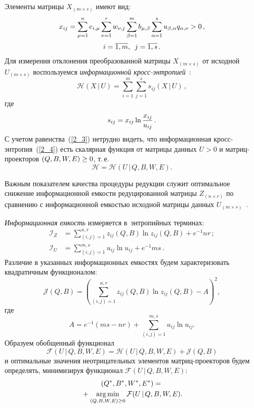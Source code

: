 \begin{multicols}{2}
Элементы матрицы $X_{(m \times s)}$ имеют вид:
\begin{multline}
\label{2_3}
x_{ij} = \sum\limits^n_{\mu=1} e_{i,\mu} \sum\limits^r_{\nu=1} w_{\nu,j} 
\sum\limits^m_{\beta=1} b_{\mu,\beta} \sum^s_{\alpha=1} u_{\beta,\alpha} 
q_{\alpha,\nu} > 0\,,\\[2pt] 
i = \overline{1,m},\enskip 
j = \overline{1,s}\,.
\end{multline}
Для измерения отклонения преобразованной матрицы $X_{(m \times s)}$ от 
исходной $U_{(m \times s)}$ воспользуемся \textit{информационной кросс-эн\-тро\-пи\-ей}~\cite{Kullback_1951}:
\begin{equation}
\label{2_4}
\mathcal{H}(X\,|\,U) = \sum\limits^m_{i=1}\sum^s_{j=1} s_{ij}(X\,|\,U)\,,
\end{equation}
где
\begin{equation*}
s_{ij} = x_{ij} \ln \displaystyle\frac{\displaystyle x_{ij}\mathstrut}{\displaystyle u_{ij}\mathstrut}\,.
\end{equation*}
С учетом равенства~(\ref{2_3}) нетрудно видеть, что информационная 
кросс-эн\-тро\-пия~(\ref{2_4}) есть скалярная функция от матрицы данных $U > 0$ и 
мат\-риц-про\-ек\-то\-ров $(Q, B, W, E) \hm\ge 0$, т.\,е.
\begin{equation*}
\mathcal{H} = \mathcal{H}(U\,|\,Q,B,W,E).
\end{equation*}

Важным показателем качества процедуры редукции служит оптимальное снижение 
информационной емкости редуцированной матрицы $Z_{(n \times r)}$ по сравнению 
с информационной емкостью исходной матрицы данных $U_{(m \times 
s)}$~\cite{Popkov_2019_dan}.

\textit{Информационная емкость} измеряется в~энтропийных терминах:
\begin{align*}
\mathcal{I}_Z &= \sum\limits^{n,r}_{(i,j)=1} z_{ij}(Q,B) \ln z_{ij}(Q,B) + 
e^{-1} nr\,;\\
\mathcal{I}_U &= \sum\limits^{m,s}_{(i,j)=1} u_{ij} \ln u_{ij} + e^{-1} 
ms\,. %
\end{align*}
Различие в указанных информационных емкостях будем характеризовать 
квадратичным функционалом:
\begin{equation*}
\mathcal{J}(Q,B) \!= \!\left(\sum\limits^{n,r}_{(i,j)=1}\!\! z_{ij}(Q,B) \ln 
z_{ij}(Q,B) - A\! \right)^{\!2}\!\!,\!\!\!
\end{equation*}
где
\begin{equation*}
A = e^{-1}(ms - nr) + \sum\limits^{m,s}_{(i,j)=1} u_{ij} \ln u_{ij}.
\end{equation*}
Образуем обобщенный функционал
\begin{equation*}
\mathcal{F}(U\,|\,Q,B,W,E) = \mathcal{H}(U\,|\,Q,B,W,E) + \mathcal{J}(Q,B)
\end{equation*}
и оптимальные значения неотрицательных элементов мат\-риц-про\-ек\-то\-ров 
будем определять, минимизируя функционал $\mathcal{F}(U\,|\,Q,B,W,E)$:
\begin{multline}
\label{2_10}
(Q^*,B^*,W^*,E^*) ={}\\
{}+ \mathop{\mathrm{arg}\,\mathrm{min}}\limits_{(Q,B,W,E) \ge 0} 
\mathcal{F}(U\,|\,Q,B,W,E).
\end{multline}


\end{multicols}
